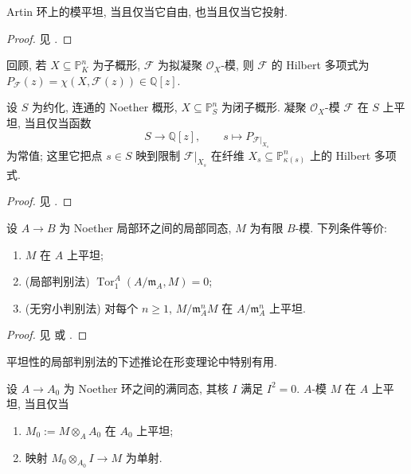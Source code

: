 \begin{proposition}\label{src:A.2.3}
Artin 环上的模平坦, 当且仅当它自由, 也当且仅当它投射.
\end{proposition}
\begin{proof}
见 \cite[Tag 051E]{SP}.
\end{proof}
回顾, 若 $X\subseteq\mathbb P_K^n$ 为子概形, $\mathcal F$ 为拟凝聚 $\mathcal O_X$-模, 则 $\mathcal F$ 的 Hilbert 多项式为 $P_{\mathcal F}(z)=\chi(X,\mathcal F(z))\in\mathbb Q[z]$.
\begin{proposition}\label{src:A.2.4}
设 $S$ 为约化, 连通的 Noether 概形, $X\subseteq\mathbb P_S^n$ 为闭子概形. 凝聚 $\mathcal O_X$-模 $\mathcal F$ 在 $S$ 上平坦, 当且仅当函数
\[
S\longrightarrow\mathbb Q[z],\qquad s\longmapsto P_{\mathcal F|_{X_s}}
\]
为常值; 这里它把点 $s\in S$ 映到限制 $\mathcal F|_{X_s}$ 在纤维 $X_s\subseteq\mathbb P_{\kappa(s)}^n$ 上的 Hilbert 多项式.
\end{proposition}
\begin{proof}
见 \cite[定理 $9.9$]{Har77}.
\end{proof}
\begin{theorem}[平坦性的局部与无穷小判别法]\label{src:A.2.5}
设 $A\to B$ 为 Noether 局部环之间的局部同态, $M$ 为有限 $B$-模. 下列条件等价:
\begin{enumerate}[(1)]
\item $M$ 在 $A$ 上平坦;
\item (局部判别法) $\operatorname{Tor}_1^A(A/\mathfrak m_A,M)=0$;
\item (无穷小判别法) 对每个 $n\geq1$, $M/\mathfrak m_A^n M$ 在 $A/\mathfrak m_A^n$ 上平坦.
\end{enumerate}
\end{theorem}
\begin{proof}
见 \cite[定理 $6.8$, 习题 $6.5$]{Eis95} 或 \cite[Tag 00MK]{SP}.
\end{proof}
平坦性的局部判别法的下述推论在形变理论中特别有用.
\begin{corollary}\label{src:A.2.6}
设 $A\to A_0$ 为 Noether 环之间的满同态, 其核 $I$ 满足 $I^2=0$. $A$-模 $M$ 在 $A$ 上平坦, 当且仅当
\begin{enumerate}[(1)]
\item $M_0:=M\otimes_A A_0$ 在 $A_0$ 上平坦;
\item 映射 $M_0\otimes_{A_0}I\to M$ 为单射.
\end{enumerate}
\end{corollary}
